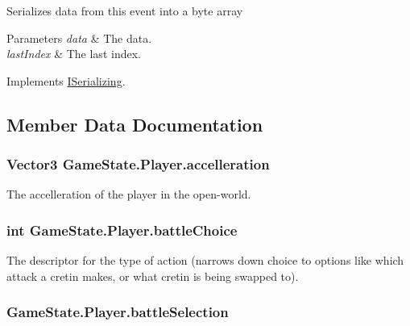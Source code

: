 Serializes data from this event into a byte array 


\begin{DoxyParams}{Parameters}
{\em data} & The data.\\
\hline
{\em last\-Index} & The last index.\\
\hline
\end{DoxyParams}


Implements \hyperlink{interface_i_serializing_ac31a44c2358a197e774fa3f79cc80356}{I\-Serializing}.



\subsection{Member Data Documentation}
\hypertarget{class_game_state_1_1_player_a8f25769e000454ef477d359f44a5ed31}{
\subsubsection[{accelleration}]{\setlength{\rightskip}{0pt plus 5cm}Vector3 Game\-State.\-Player.\-accelleration}}\label{class_game_state_1_1_player_a8f25769e000454ef477d359f44a5ed31}


The accelleration of the player in the open-\/world. 

\hypertarget{class_game_state_1_1_player_a3bfa8ea6e2067982474dc4f6073061c5}{
\subsubsection[{battle\-Choice}]{\setlength{\rightskip}{0pt plus 5cm}int Game\-State.\-Player.\-battle\-Choice}}\label{class_game_state_1_1_player_a3bfa8ea6e2067982474dc4f6073061c5}


The descriptor for the type of action (narrows down choice to options like which attack a cretin makes, or what cretin is being swapped to). 

\hypertarget{class_game_state_1_1_player_a123c8ee2ef6e66e88bcca1a80f73ab4a}{
\subsubsection[{battle\-Selection}]{ Game\-State.\-Player.\-battle\-Selection}}\label{class_game_state_1_1_player_a123c8ee2ef6e66e88bcca1a80f73ab4a}


